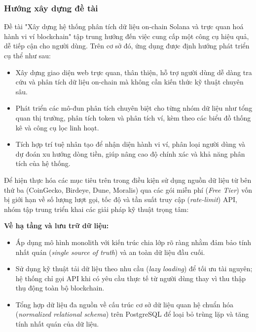 \documentclass{article}[14pt]
\begin{document}
{\subsubsection{Hướng xây dựng đề tài}
    \hspace{0.3cm} Đề tài "Xây dựng hệ thống phân tích dữ liệu on-chain Solana và trực quan hoá hành vi ví blockchain" tập trung hướng đến việc cung cấp một công cụ hiệu quả, dễ tiếp cận cho người dùng. Trên cơ sở đó, ứng dụng được định hướng phát triển cụ thể như sau:
    
    \begin{itemize}
        \item Xây dựng giao diện web trực quan, thân thiện, hỗ trợ người dùng dễ dàng tra cứu và phân tích dữ liệu on-chain mà không cần kiến thức kỹ thuật chuyên sâu.
        \item Phát triển các mô-đun phân tích chuyên biệt cho từng nhóm dữ liệu như tổng quan thị trường, phân tích token và phân tích ví, kèm theo các biểu đồ thống kê và công cụ lọc linh hoạt.
        \item Tích hợp trí tuệ nhân tạo để nhận diện hành vi ví, phân loại người dùng và dự đoán xu hướng dòng tiền, giúp nâng cao độ chính xác và khả năng phân tích của hệ thống.
    \end{itemize}

    Để hiện thực hóa các mục tiêu trên trong điều kiện sử dụng nguồn dữ liệu từ bên thứ ba (CoinGecko, Birdeye, Dune, Moralis) qua các gói miễn phí ({\it Free Tier}) vốn bị giới hạn về số lượng lượt gọi, tốc độ và tần suất truy cập ({\it rate-limit}) API, nhóm tập trung triển khai các giải pháp kỹ thuật trọng tâm:

\textbf {Về hạ tầng và lưu trữ dữ liệu:}
    \begin{itemize}
      \item   Áp dụng mô hình monolith với kiến trúc chia lớp rõ ràng nhằm đảm bảo tính nhất quán ({\it single source of truth}) và an toàn dữ liệu đầu cuối.

\item Sử dụng kỹ thuật tải dữ liệu theo nhu cầu ({\it lazy loading}) để tối ưu tài nguyên; hệ thống chỉ gọi API khi có yêu cầu thực tế từ người dùng thay vì thu thập thụ động toàn bộ blockchain.

\item Tổng hợp dữ liệu đa nguồn về cấu trúc cơ sở dữ liệu quan hệ chuẩn hóa ({\it normalized relational schema}) trên PostgreSQL để loại bỏ trùng lặp và tăng tính nhất quán của dữ liệu.


\end{itemize}}
\end{document}

